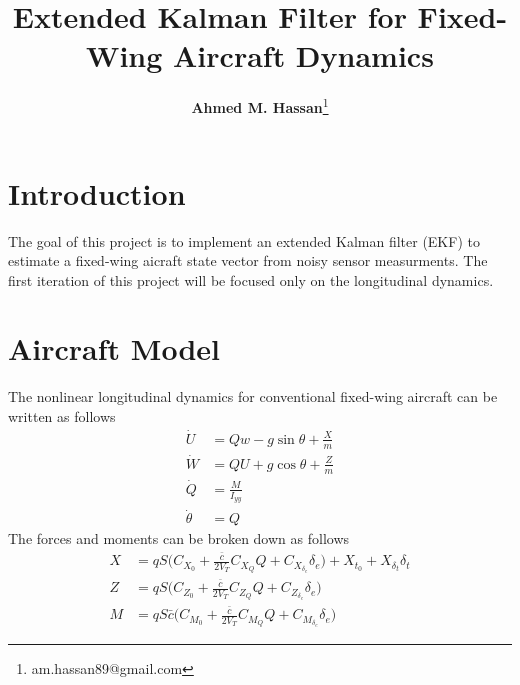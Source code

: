 \documentclass{article}
\title{\textbf{Extended Kalman Filter for Fixed-Wing Aircraft Dynamics}}
\author{\textbf{Ahmed M. Hassan}\thanks{am.hassan89@gmail.com}}
\begin{document}
\maketitle

\section{Introduction}
The goal of this project is to implement an extended Kalman filter (EKF) to estimate
a fixed-wing aicraft state vector from noisy sensor measurments. 
The first iteration of this project will be focused only on the longitudinal dynamics.
   
\section{Aircraft Model}
The nonlinear longitudinal dynamics for conventional fixed-wing aircraft can be written as follows \cite{Nelson, Stevens-Lewis}
\begin{equation}\label{Eq:Nonlinear_sys}
    \begin{split}
        \dot{U} &= Q w - g \sin{\theta} + \frac{X}{m}\\
        \dot{W} &= Q U + g \cos{\theta} + \frac{Z}{m}\\
        \dot{Q} &= \frac{M}{I_{yy}}\\
        \dot{\theta} &= Q
    \end{split}
\end{equation}
The forces and moments can be broken down as follows
\begin{equation}
    \begin{split}
        X &= q S \biggl(C_{X_0} + \frac{\bar{c}}{2 V_T} C_{X_Q} Q + C_{X_{\delta_e}} \delta_e\biggr) +
        X_{t_0} + X_{\delta_t} \delta_t\\
        Z &= q S \biggl(C_{Z_0} + \frac{\bar{c}}{2 V_T} C_{Z_Q} Q + C_{Z_{\delta_e}} \delta_e\biggr)\\
        M &= q S \bar{c} \biggl(C_{M_0} + \frac{\bar{c}}{2 V_T} C_{M_Q} Q + C_{M_{\delta_e}} \delta_e \biggr)
    \end{split}
\end{equation}
\end{document}
